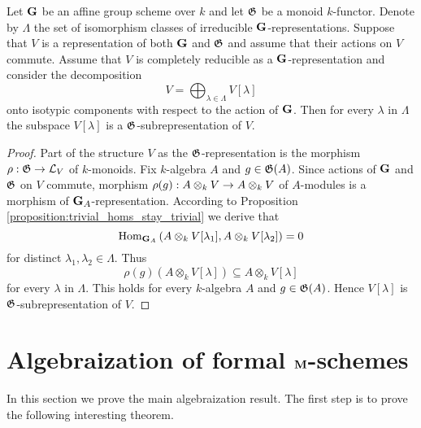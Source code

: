 \begin{corollary}\label{corollary:commuting_action_preserves_isotypic_decomposition}
Let $\mathbf{G}$ be an affine group scheme over $k$ and let ${\mathfrak G}$ be a monoid $k$-functor. Denote by $\Lambda$ the set of isomorphism classes of irreducible $\mathbf{G}$-representations. Suppose that $V$ is a representation of both $\mathbf{G}$ and ${\mathfrak G}$ and assume that their actions on $V$ commute. Assume that $V$ is completely reducible as a $\mathbf{G}$-representation and consider the decomposition
$$V = \bigoplus_{\lambda\in \Lambda}V[\lambda]$$
onto isotypic components with respect to the action of $\mathbf{G}$. Then for every $\lambda$ in $\Lambda$ the subspace $V[\lambda]$ is a ${\mathfrak G}$-subrepresentation of $V$.
\end{corollary}
\begin{proof}
Part of the structure $V$ as the ${\mathfrak G}$-representation is the morphism $\rho:{\mathfrak G} \rightarrow {\mathcal L}_V$ of $k$-monoids. Fix $k$-algebra $A$ and $g\in {\mathfrak G}(A)$. Since actions of $\mathbf{G}$ and ${\mathfrak G}$ on $V$ commute, morphism $\rho(g):A\otimes_kV\rightarrow A\otimes_kV$ of $A$-modules is a morphism of $\mathbf{G}_A$-representation. According to Proposition \ref{proposition:trivial_homs_stay_trivial} we derive that
$$\mathrm{Hom}_{\mathbf{G}_A}\left(A\otimes_kV[\lambda_1],A\otimes_kV[\lambda_2]\right) = 0$$
for distinct $\lambda_1,\lambda_2\in \Lambda$. Thus
$$\rho(g)\left(A \otimes_k V[\lambda] \right)\subseteq A \otimes_kV[\lambda]$$
for every $\lambda$ in $\Lambda$. This holds for every $k$-algebra $A$ and $g\in {\mathfrak G}(A)$. Hence $V[\lambda]$ is ${\mathfrak G}$-subrepresentation of $V$.
\end{proof}


\section{Algebraization of formal $\mathbf{M}$-schemes}
\noindent
In this section we prove the main algebraization result. The first step is to prove the following interesting theorem. 

